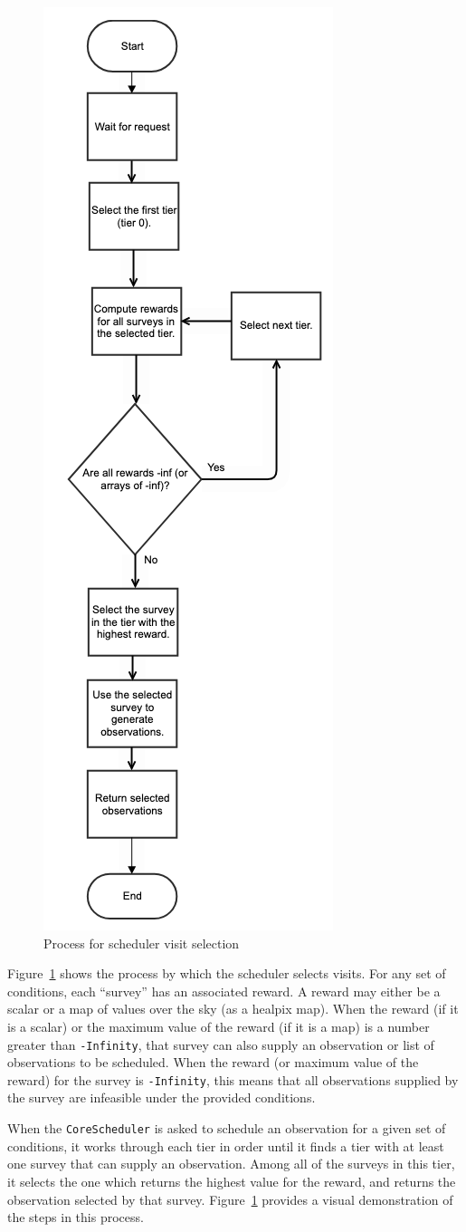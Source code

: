 \documentclass[OPS,lsstdraft,authoryear,toc]{lsstdoc}
\begin{document}
\begin{figure}
    \centering
    \includegraphics[width=0.35\linewidth]{schedprocess.png}
    \caption{Process for scheduler visit selection}
    \label{fig:schedprocess}
\end{figure}

Figure~\ref{fig:schedprocess} shows the process by which the scheduler selects visits.
For any set of conditions, each ``survey'' has an associated reward. A reward may either be a scalar or a map of values over the sky (as a healpix map).
When the reward (if it is a scalar) or the maximum value of the reward (if it is a map) is a number greater than \texttt{-Infinity}, that survey can also supply an observation or list of observations to be scheduled.
When the reward (or maximum value of the reward) for the survey is \texttt{-Infinity}, this means that all observations supplied by the survey are infeasible under the provided conditions.

When the \texttt{CoreScheduler} is asked to schedule an observation for a given set of conditions, it works through each tier in order until it finds a tier with at least one survey that can supply an observation. Among all of the surveys in this tier, it selects the one which returns the highest value for the reward, and returns the observation selected by that survey. Figure~\ref{fig:schedprocess} provides a visual demonstration of the steps in this process.
\end{document}
